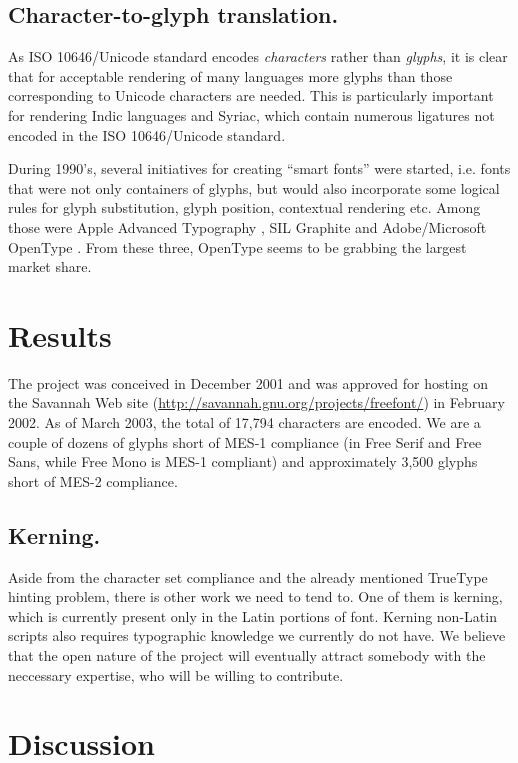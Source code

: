 \documentclass[english]{eurotex2003}
\begin{document}
\subsection{Character-to-glyph translation.}

As ISO 10646/Unicode standard encodes \emph{characters} rather than
\emph{glyphs}, it is clear that for acceptable rendering of many
langua\-ges more glyphs than those corresponding to Unicode characters
are needed. This is particularly important for rendering Indic
languages and Syriac, which contain numerous ligatures not encoded in
the ISO 10646/Unicode standard.

During 1990's, several initiatives for creating ``smart fonts'' were
started, i.e. fonts that were not only containers of glyphs, but would
also incorporate some logical rules for glyph substitution, glyph
position, contextual rendering etc. Among those were Apple Advanced
Typography \cite{Apple:AAT}, SIL Graphite \cite{SIL:Graphite} and
Adobe/Microsoft OpenType \cite{Microsoft:OpenType}. From these three,
OpenType seems to be grabbing the largest market share.

\section{Results}

The project was conceived in December 2001 and was approved for
hosting on the Savannah Web site
(\url{http://savannah.gnu.org/projects/freefont/}) in February
2002. As of March 2003, the total of 17,794 characters are encoded. We
are a couple of dozens of glyphs short of MES-1 compliance (in Free
Serif and Free Sans, while Free Mono is MES-1 compliant) and
approximately 3,500 glyphs short of MES-2 compliance.

\subsection{Kerning.}
Aside from the character set compliance and the already mentioned
TrueType hinting problem, there is other work we need to tend to. One
of them is kerning, which is currently present only in the Latin
portions of font. Kerning non-Latin scripts also requires typographic
knowledge we currently do not have. We believe that the open nature of
the project will eventually attract somebody with the neccessary
expertise, who will be willing to contribute.

\section{Discussion}
\end{document}
